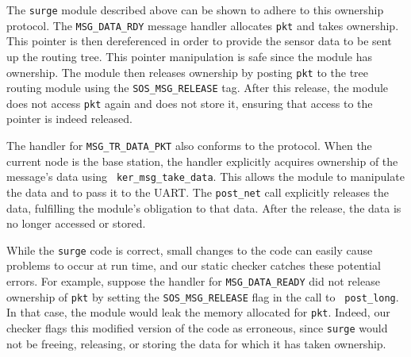 The {\tt surge} module described above can be shown to adhere to this
ownership protocol.  The {\tt MSG\_DATA\_RDY} message handler
allocates {\tt pkt} and takes ownership. This pointer is then
dereferenced in order to provide the sensor data to be sent up the
routing tree.  This pointer manipulation is safe since the module has
ownership.  The module then releases ownership by posting {\tt pkt} to
the tree routing module using the {\tt SOS\_MSG\_RELEASE} tag.  After
this release, the module does not access {\tt pkt} again and does not
store it, ensuring that access to the pointer is indeed released. 

The handler for {\tt MSG\_TR\_DATA\_PKT} also conforms to the
protocol.   When the current node is the base station, the handler
explicitly acquires ownership of the message's data using {\tt
ker\_msg\_take\_data}.  This allows the module to manipulate the data
and to pass it to the UART.  The {\tt post\_net} call explicitly
releases the data, fulfilling the module's obligation to that data.
After the release, the data is no longer accessed or stored.

While the {\tt surge} code is correct, small changes to the code can
easily cause problems to occur at run time, and our static checker
catches these potential errors.  
For example, suppose the handler for
{\tt MSG\_DATA\_READY} did not release ownership of {\tt pkt} by
setting the {\tt SOS\_MSG\_RELEASE} flag in the call to {\tt
post\_long}.  In that case, the module would leak the memory allocated
for {\tt pkt}.  Indeed, our checker flags this modified version of the
code as erroneous, since {\tt surge} would not be freeing, releasing,
or storing the data for which it has taken ownership.


